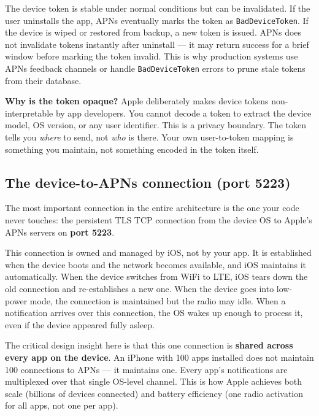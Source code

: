 \documentclass[11pt,a4paper]{article}
\begin{document}
The device token is stable under normal conditions but can be invalidated. If the user uninstalls the app, APNs eventually marks the token as \texttt{BadDeviceToken}. If the device is wiped or restored from backup, a new token is issued. APNs does not invalidate tokens instantly after uninstall --- it may return success for a brief window before marking the token invalid. This is why production systems use APNs feedback channels or handle \texttt{BadDeviceToken} errors to prune stale tokens from their database.

\begin{thinkbox}
\textbf{Why is the token opaque?} Apple deliberately makes device tokens non-interpretable by app developers. You cannot decode a token to extract the device model, OS version, or any user identifier. This is a privacy boundary. The token tells you \emph{where} to send, not \emph{who} is there. Your own user-to-token mapping is something you maintain, not something encoded in the token itself.
\end{thinkbox}

\subsection{The device-to-APNs connection (port 5223)}

The most important connection in the entire architecture is the one your code never touches: the persistent TLS TCP connection from the device OS to Apple's APNs servers on \textbf{port 5223}.

This connection is owned and managed by iOS, not by your app. It is established when the device boots and the network becomes available, and iOS maintains it automatically. When the device switches from WiFi to LTE, iOS tears down the old connection and re-establishes a new one. When the device goes into low-power mode, the connection is maintained but the radio may idle. When a notification arrives over this connection, the OS wakes up enough to process it, even if the device appeared fully asleep.

The critical design insight here is that this one connection is \textbf{shared across every app on the device}. An iPhone with 100 apps installed does not maintain 100 connections to APNs --- it maintains one. Every app's notifications are multiplexed over that single OS-level channel. This is how Apple achieves both scale (billions of devices connected) and battery efficiency (one radio activation for all apps, not one per app).
\end{document}
